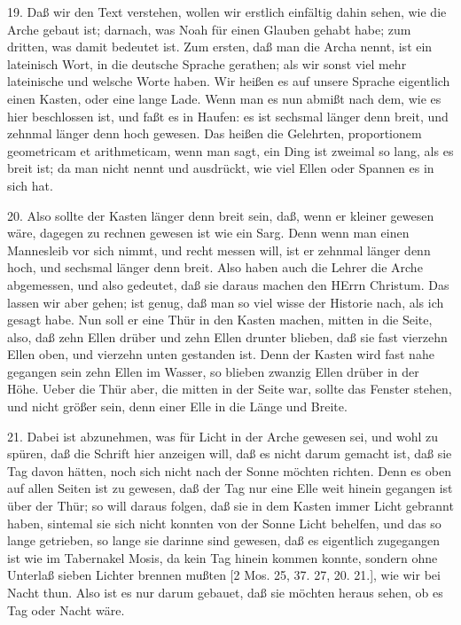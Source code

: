 19. Daß wir den Text verstehen, wollen wir erstlich einfältig dahin sehen, wie die Arche gebaut ist; darnach, was Noah für einen Glauben gehabt habe; zum dritten, was damit bedeutet ist. Zum ersten, daß man die Archa nennt, ist ein lateinisch Wort, in die deutsche Sprache gerathen; als wir sonst viel mehr lateinische und welsche Worte haben. Wir heißen es auf unsere Sprache eigentlich einen Kasten, oder eine lange Lade. Wenn man es nun abmißt nach dem, wie es hier beschlossen ist, und faßt es in Haufen: es ist sechsmal länger denn breit, und zehnmal länger denn hoch gewesen. Das heißen die Gelehrten, proportionem geometricam et arithmeticam, wenn man sagt, ein Ding ist zweimal so lang, als es breit ist; da man nicht nennt und ausdrückt, wie viel Ellen oder Spannen es in sich hat.

20. Also sollte der Kasten länger denn breit sein, daß, wenn er kleiner gewesen wäre, dagegen zu rechnen gewesen ist wie ein Sarg. Denn wenn man einen Mannesleib vor sich nimmt, und recht messen will, ist er zehnmal länger denn hoch, und sechsmal länger denn breit. Also haben auch die Lehrer die Arche abgemessen, und also gedeutet, daß sie daraus machen den HErrn Christum. Das lassen wir aber gehen; ist genug, daß man so viel wisse der Historie nach, als ich gesagt habe. Nun soll er eine Thür in den Kasten machen, mitten in die Seite, also, daß zehn Ellen drüber und zehn Ellen drunter blieben, daß sie fast vierzehn Ellen oben, und vierzehn unten gestanden ist. Denn der Kasten wird fast nahe gegangen sein zehn Ellen im Wasser, so blieben zwanzig Ellen drüber in der Höhe. Ueber die Thür aber, die mitten in der Seite war, sollte das Fenster stehen, und nicht größer sein, denn einer Elle in die Länge und Breite.

21. Dabei ist abzunehmen, was für Licht in der Arche gewesen sei, und wohl zu spüren, daß die Schrift hier anzeigen will, daß es nicht darum gemacht ist, daß sie Tag davon hätten, noch sich nicht nach der Sonne möchten richten. Denn es oben auf allen Seiten ist zu gewesen, daß der Tag nur eine Elle weit hinein gegangen ist über der Thür; so will daraus folgen, daß sie in dem Kasten immer Licht gebrannt haben, sintemal sie sich nicht konnten von der Sonne Licht behelfen, und das so lange getrieben, so lange sie darinne sind gewesen, daß es eigentlich zugegangen ist wie im Tabernakel Mosis, da kein Tag hinein kommen konnte, sondern ohne Unterlaß sieben Lichter brennen mußten [2 Mos. 25, 37. 27, 20. 21.], wie wir bei Nacht thun. Also ist es nur darum gebauet, daß sie möchten heraus sehen, ob es Tag oder Nacht wäre.


